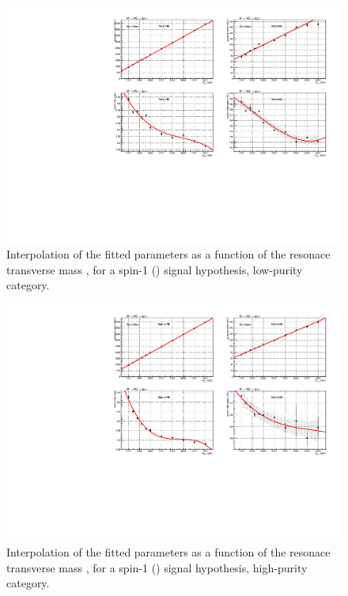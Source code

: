 \begin{figure}[!htb]
  \centering
    \includegraphics[width=.95\textwidth]{plotsAlpha_tesi/XVZnnlp/XWZInv_SignalShape.pdf}
  \caption{Interpolation of the fitted parameters as a function of the resonace transverse mass \mtVZ, for a spin-1 (\Wp) signal hypothesis, low-purity category.}
  \label{fig:XWZ_SignalShapeLP}
\end{figure}

\begin{figure}[!htb]
  \centering
    \includegraphics[width=.95\textwidth]{plotsAlpha_tesi/XVZnnhp/XWZInv_SignalShape.pdf}

  \caption{Interpolation of the fitted parameters as a function of the resonace transverse mass \mtVZ, for a spin-1 (\Wp) signal hypothesis, high-purity category.}
  \label{fig:XWZ_SignalShapeHP}
\end{figure}


